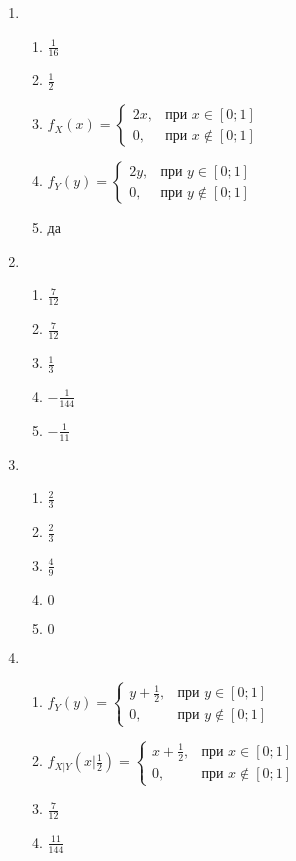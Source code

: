 \begin{multicols}{2}
\begin{enumerate}
\item
\begin{enumerate}
\item $\frac{1}{16}$
\item $\frac{1}{2}$
\item $f_{X}(x) =
\begin{cases} 2x, & \text{при } x \in [0;1] \\
0 , & \text{при } x \not\in [0;1]
\end{cases}$
\item $f_{Y}(y) =
\begin{cases} 2y, & \text{при } y \in [0;1] \\
0 , & \text{при } y \not\in [0;1]
\end{cases}$
\item да
\end{enumerate}
\item
\begin{enumerate}
\item $\frac{7}{12}$
\item $\frac{7}{12}$
\item $\frac{1}{3}$
\item $-\frac{1}{144}$
\item $-\frac{1}{11}$
\end{enumerate}

\item
\begin{enumerate}
\item $\frac{2}{3}$
\item $\frac{2}{3}$
\item $\frac{4}{9}$
\item $0$
\item $0$
\end{enumerate}

\item
\begin{enumerate}
\item $f_{Y}(y) =
\begin{cases} y+\frac{1}{2}, & \text{при } y \in [0;1] \\
0 , & \text{при } y \not\in [0;1]
\end{cases}$
\item $f_{X|Y}(x|\frac{1}{2}) =
\begin{cases} x+\frac{1}{2}, & \text{при } x \in [0;1] \\
0 , & \text{при } x \not\in [0;1]
\end{cases}$
\item $\frac{7}{12}$
\item $\frac{11}{144}$
\end{enumerate}


\end{enumerate}
\end{multicols}
